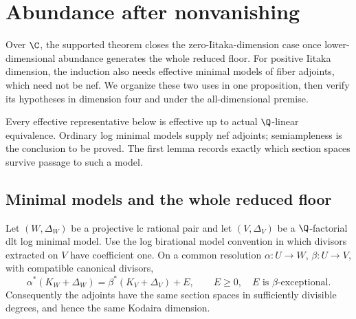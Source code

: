 \section{Abundance after nonvanishing}
\label{bl:sec:abundance}

Over $\C$, the supported theorem closes the zero-Iitaka-dimension
case once lower-dimensional abundance generates the whole reduced
floor. For positive Iitaka dimension, the induction also needs
effective minimal models of fiber adjoints, which need not be nef.
We organize these two uses in one proposition, then verify its
hypotheses in dimension four and under the all-dimensional premise.

Every effective representative below is effective up to actual
$\Q$-linear equivalence. Ordinary log minimal models supply nef
adjoints; semiampleness is the conclusion to be proved. The first
lemma records exactly which section spaces survive passage to such
a model.

\subsection{Minimal models and the whole reduced floor}

\begin{lemma}
\label{bl:lem:abundance-model-comparison}
Let $(W,\Delta_W)$ be a projective lc rational pair and let
$(V,\Delta_V)$ be a $\Q$-factorial dlt log minimal model.  Use the
log birational model convention in which divisors extracted on $V$
have coefficient one.  On a common resolution
$\alpha:U\to W$, $\beta:U\to V$, with compatible canonical divisors,
\begin{equation}
 \alpha^*(K_W+\Delta_W)
   =\beta^*(K_V+\Delta_V)+E,
 \qquad E\geq0,\quad E\text{ is }\beta\text{-exceptional}.
 \label{bl:eq:abundance-model-comparison}
\end{equation}
Consequently the adjoints have the same section spaces in sufficiently
divisible degrees, and hence the same Kodaira dimension.
\end{lemma}

